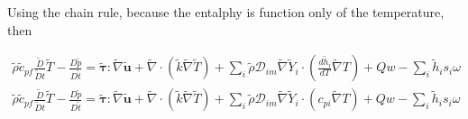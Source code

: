 \documentclass[preprint,12pt,authoryear]{elsarticle}
\begin{document}
Using the chain rule, because the entalphy is function only of the temperature, then 

\begin{equation}
\begin{split}
        \tilde{\rho}
        \tilde{c}_{pf}
        \frac{\tilde{D}}{\tilde{D} t}
        \tilde{T}
        -
        \frac{D \tilde{p}}{D\tilde{t}}
        =
        \pmb{\tilde{\tau}}:\tilde{\nabla} \tilde{\mathbf{u}} 
        + 
        \tilde{\nabla} \cdot (\tilde{k}\tilde{\nabla} \tilde{T})
        +
        \sum\limits_i 
        \tilde{\rho}
        \mathcal{D}_{im}
        \tilde{\nabla}
        \tilde{Y}_i     
        \cdot
        \left(
        \frac{d \tilde{h}_i}{ d T}
        \tilde{\nabla}T 
        \right)
	+
	Qw
	-
        \sum\limits_i
	\tilde{h}_i
        s_i \omega	
\\
        \tilde{\rho}
        \tilde{c}_{pf}
        \frac{\tilde{D}}{\tilde{D} t}
        \tilde{T}
        -
        \frac{D \tilde{p}}{D\tilde{t}}
        =
        \pmb{\tilde{\tau}}:\tilde{\nabla} \tilde{\mathbf{u}} 
        + 
        \tilde{\nabla} \cdot (\tilde{k}\tilde{\nabla} \tilde{T})
        +
        \sum\limits_i 
        \tilde{\rho}
        \mathcal{D}_{im}
        \tilde{\nabla}
        \tilde{Y}_i     
        \cdot
        \left(
        c_{pi}
        \tilde{\nabla}T 
        \right)
	+
	Qw
	-
        \sum\limits_i
	\tilde{h}_i
        s_i \omega	
%      
\end{split}
\end{equation}
\end{document}

